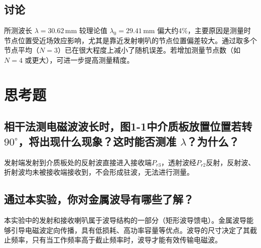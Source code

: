 \documentclass{../ElectromagneticFieldTemplate}
\begin{document}
\subsection{讨论}
所测波长 \(\lambda = 30.62\,\text{mm}\) 较理论值 \(\lambda_0 = 29.41\,\text{mm}\) 偏大约4\%，主要原因是测量时节点位置受近场效应影响，尤其是靠近发射喇叭的节点位置偏差较大。通过取多个节点平均（\(N=3\)）已在很大程度上减小了随机误差。若增加测量节点数（如 \(N=4\) 或更大），可进一步提高测量精度。

\section{思考题}
\subsection{相干法测电磁波波长时，图1-1中介质板放置位置若转 \(90^\circ\)，将出现什么现象？这时能否测准 \(\lambda\)？为什么？}
发射端发射到介质板处的反射波直接进入接收端\(P_{r3}\)，透射波经\(P_{r2}\)反射，反射波、折射波均未被接收端接收到，不会形成驻波，无法进行测量。

\subsection{通过本实验，你对金属波导有哪些了解？}
本实验中的发射和接收喇叭属于波导结构的一部分（矩形波导馈电）。金属波导能够引导电磁波定向传播，具有低损耗、高功率容量等优点。波导的尺寸决定了其截止频率，只有当工作频率高于截止频率时，波导才能有效传输电磁波。
\end{document}

